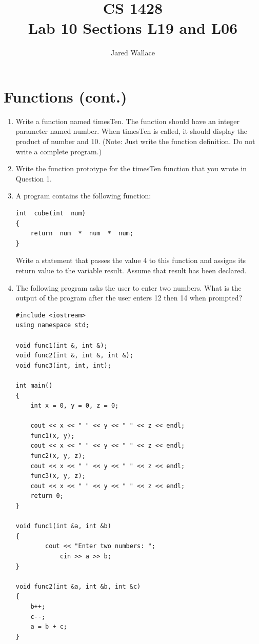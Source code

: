 \documentclass[letterpaper,12pt]{article}
\title{\Large CS 1428\\Lab 10 Sections L19 and L06}
\author{Jared Wallace}
\date{}
\begin{document}
\maketitle

\section*{Functions (cont.)}
\begin{enumerate}
	\item Write a function named timesTen.  The function should have an integer parameter named number.  When timesTen is called, it should display the product of number and 10.  (Note:  Just write the function definition.  Do not write a complete program.)
		\vspace{20mm}
	\item Write the function prototype for the timesTen function that you wrote in Question 1.
		\vspace{15mm}
	\item A program contains the following function:
	\begin{lstlisting}[basicstyle=\footnotesize\ttfamily]
int  cube(int  num)
{
	return  num  *  num  *  num;
}
		\end{lstlisting}
		Write a statement that passes the value 4 to this function and assigns its return value to the variable result.  Assume that result has been declared.
		\vspace{20mm}
	\item The following program asks the user to enter two numbers. What is the output of the program after the user enters 12 then 14 when prompted?
	
	\begin{lstlisting}[basicstyle=\footnotesize\ttfamily]
#include <iostream>
using namespace std;

void func1(int &, int &);
void func2(int &, int &, int &);
void func3(int, int, int);

int main()
{
	int x = 0, y = 0, z = 0;

	cout << x << " " << y << " " << z << endl;
	func1(x, y);
	cout << x << " " << y << " " << z << endl;
	func2(x, y, z);
	cout << x << " " << y << " " << z << endl;
	func3(x, y, z);
	cout << x << " " << y << " " << z << endl;
	return 0;
}

void func1(int &a, int &b)
{
		cout << "Enter two numbers: ";
			cin >> a >> b; 
}

void func2(int &a, int &b, int &c)
{
	b++;
	c--;
	a = b + c;
}


\end{lstlisting}
\end{enumerate}
\end{document}
